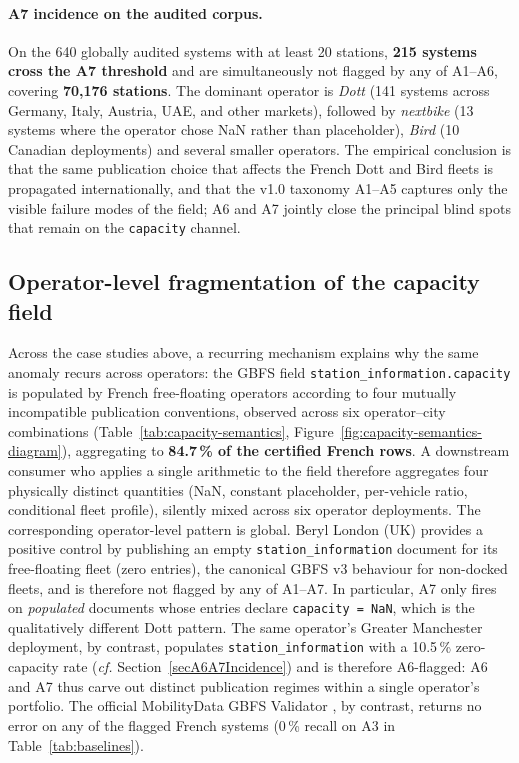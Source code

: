 \documentclass[11pt,a4paper]{article}
\begin{document}
\paragraph{A7 incidence on the audited corpus.}
On the 640 globally audited systems with at least 20 stations,
\textbf{215 systems cross the A7 threshold} and are simultaneously
not flagged by any of A1--A6, covering \textbf{70{,}176 stations}.
The dominant operator is \emph{Dott} (141 systems across Germany,
Italy, Austria, UAE, and other markets), followed by
\emph{nextbike} (13 systems where the operator chose NaN rather
than placeholder), \emph{Bird} (10 Canadian deployments) and
several smaller operators. The empirical conclusion is that the
same publication choice that affects the French Dott and Bird
fleets is propagated internationally, and that the v1.0 taxonomy
A1--A5 captures only the visible failure modes of the field; A6
and A7 jointly close the principal blind spots that remain on the
\texttt{capacity} channel.

\subsection{Operator-level fragmentation of the capacity field}
Across the case studies above, a recurring mechanism explains why
the same anomaly recurs across operators: the GBFS field
\texttt{station\_information.capacity} is populated by French
free-floating operators according to four mutually incompatible
publication conventions, observed across six operator--city
combinations (Table~\ref{tab:capacity-semantics},
Figure~\ref{fig:capacity-semantics-diagram}), aggregating to
\textbf{84.7\,\% of the certified French rows}. A downstream
consumer who applies a single arithmetic to the field therefore
aggregates four physically distinct quantities (NaN, constant
placeholder, per-vehicle ratio, conditional fleet profile),
silently mixed across six operator deployments. The corresponding
operator-level pattern is global. Beryl London (UK) provides a
positive control by publishing an empty \texttt{station\_information}
document for its free-floating fleet (zero entries), the canonical
GBFS v3 behaviour for non-docked fleets, and is therefore not flagged
by any of A1--A7. In particular, A7 only fires on \emph{populated}
documents whose entries declare \texttt{capacity = NaN}, which is the
qualitatively different Dott pattern. The same operator's
Greater Manchester deployment, by contrast, populates
\texttt{station\_information} with a 10.5\,\% zero-capacity rate
(\emph{cf.} Section~\ref{secA6A7Incidence}) and is therefore
A6-flagged: A6 and A7 thus carve out distinct publication regimes
within a single operator's portfolio. The official MobilityData GBFS
Validator \cite{MobilityData2024Validator}, by contrast, returns no
error on any of the flagged French systems (0\,\% recall on A3 in
Table~\ref{tab:baselines}).
\end{document}
